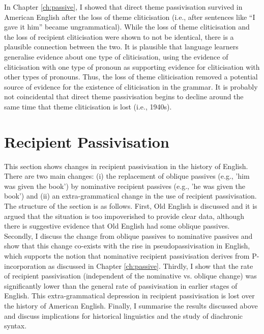 	In Chapter \ref{ch:passive}, I showed that direct theme passivisation survived in American English after the loss of theme cliticisation (i.e., after sentences like ``I gave it him'' became ungrammatical). While the loss of theme cliticisation and the loss of recipient cliticisation were shown to not be identical, there is a plausible connection between the two. It is plausible that language learners generalise evidence about one type of cliticisation, using the evidence of cliticisation with one type of pronoun as supporting evidence for cliticisation with other types of pronouns. Thus, the loss of theme cliticisation removed a potential source of evidence for the existence of cliticisation in the grammar. It is probably not coincidental that direct theme passivisation begins to decline around the same time that theme cliticisation is lost (i.e., 1940s).
 
	\section{Recipient Passivisation}\label{sec:en-pas}

	This section shows changes in recipient passivisation in the history of English. There are two main changes: (i) the replacement of oblique passives (e.g., 'him was given the book') by nominative recipient passives (e.g., 'he was given the book') and (ii) an extra-grammatical change in the use of recipient passivisation. The structure of the section is as follows. First, Old English is discussed and it is argued that the situation is too impoverished to provide clear data, although there is suggestive evidence that Old English had some oblique passives. Secondly, I discuss the change from oblique passives to nominative passives and show that this change co-exists with the rise in pseudopassivisation in English, which supports the notion that nominative recipient passivisation derives from P-incorporation as discussed in Chapter \ref{ch:passive}. Thirdly, I show that the rate of recipient passivisation (independent of the nominative vs. oblique change) was significantly lower than the general rate of passivisation in earlier stages of English. This extra-grammatical depression in recipient passivisation is lost over the history of American English. Finally, I summarise the results discussed above and discuss implications for historical linguistics and the study of diachronic syntax.

